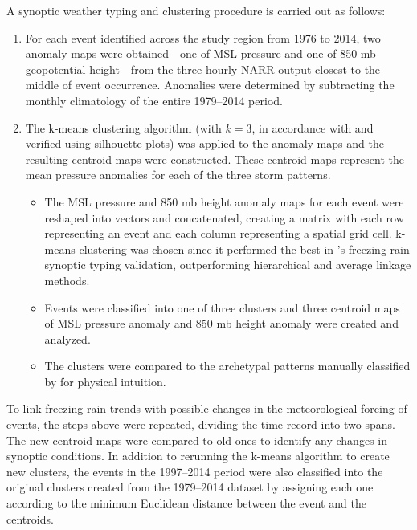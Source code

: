 \documentclass[twocol]{ametsoc}
\begin{document}
A synoptic weather typing and clustering procedure is carried out as follows:

\begin{enumerate}
\item
For each event identified across the study region from 1976 to 2014, two anomaly maps were obtained---one of MSL pressure and one of 850 mb geopotential height---from the three-hourly NARR output closest to the middle of event occurrence. Anomalies were determined by subtracting the monthly climatology of the entire 1979--2014 period.
\item
The k-means clustering algorithm (with $k=3$, in accordance with \citet{erfani2012automated} and verified using silhouette plots) was applied to the anomaly maps and the resulting centroid maps were constructed. These centroid maps represent the mean pressure anomalies for each of the three storm patterns.
\begin{itemize}
\item
The MSL pressure and 850 mb height anomaly maps for each event were reshaped into vectors and concatenated, creating a matrix with each row representing an event and each column representing a spatial grid cell. k-means clustering was chosen since it performed the best in \citet{erfani2012automated}'s freezing rain synoptic typing validation, outperforming hierarchical and average linkage methods.
\item
Events were classified into one of three clusters and three centroid maps of MSL pressure anomaly and 850 mb height anomaly were created and analyzed.
\item
The clusters were compared to the archetypal patterns manually classified by \citet{rauber2001synoptic} for physical intuition.
\end{itemize}
\end{enumerate}

To link freezing rain trends with possible changes in the meteorological forcing of events, the steps above were repeated, dividing the time record into two spans. The new centroid maps were compared to old ones to identify any changes in synoptic conditions. In addition to rerunning the k-means algorithm to create new clusters, the events in the 1997--2014 period were also classified into the original clusters created from the 1979--2014 dataset by assigning each one according to the minimum Euclidean distance between the event and the centroids. 
\end{document}
